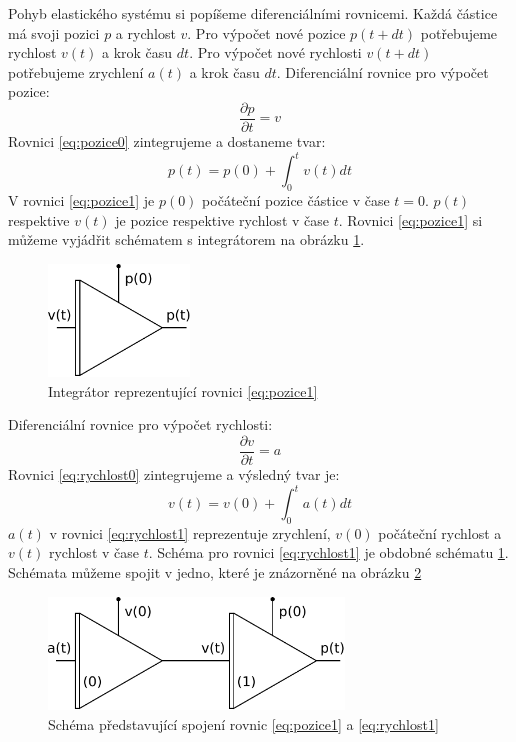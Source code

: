 Pohyb elastického systému si popíšeme diferenciálními rovnicemi.
Každá částice má svoji pozici $p$ a rychlost $v$.
Pro výpočet nové pozice $p(t+dt)$ potřebujeme rychlost $v(t)$ a krok času $dt$.
Pro výpočet nové rychlosti $v(t+dt)$ potřebujeme zrychlení $a(t)$ a krok času $dt$.
Diferenciální rovnice pro výpočet pozice:
\begin{equation}
\label{eq:pozice0}
\frac{\partial p}{\partial t} = v
\end{equation}
Rovnici \ref{eq:pozice0} zintegrujeme a dostaneme tvar:
\begin{equation}
\label{eq:pozice1}
p(t)=p(0)+\int_0^t v(t) dt
\end{equation}
V rovnici \ref{eq:pozice1} je $p(0)$ počáteční pozice částice v čase $t=0$.
$p(t)$ respektive $v(t)$ je pozice respektive rychlost v čase $t$.
Rovnici \ref{eq:pozice1} si můžeme vyjádřit schématem s integrátorem na obrázku \ref{fig:intpos}.
\begin{figure}[h]
\centering
\includegraphics[height=3cm,keepaspectratio]{obr/intpos.pdf}
\caption{Integrátor reprezentující rovnici \ref{eq:pozice1}}
\label{fig:intpos}
\end{figure}
Diferenciální rovnice pro výpočet rychlosti:
\begin{equation}
\label{eq:rychlost0}
\frac{\partial v}{\partial t} = a
\end{equation}
Rovnici \ref{eq:rychlost0} zintegrujeme a výsledný tvar je:
\begin{equation}
\label{eq:rychlost1}
v(t)=v(0)+\int_0^t a(t) dt
\end{equation}
$a(t)$ v rovnici \ref{eq:rychlost1} reprezentuje zrychlení, $v(0)$ počáteční rychlost a $v(t)$ rychlost v čase $t$.
Schéma pro rovnici \ref{eq:rychlost1} je obdobné schématu \ref{fig:intpos}.
Schémata můžeme spojit v jedno, které je znázorněné na obrázku \ref{fig:intvelpos}
\begin{figure}[h]
\centering
\includegraphics[height=3cm,keepaspectratio]{obr/intvelpos.pdf}
\caption{Schéma představující spojení rovnic \ref{eq:pozice1} a \ref{eq:rychlost1}}
\label{fig:intvelpos}
\end{figure}
